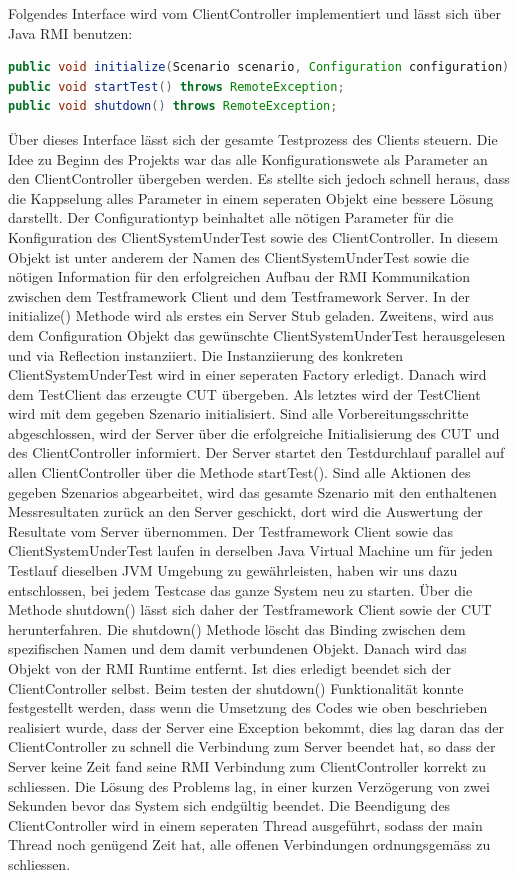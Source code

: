 Folgendes Interface wird vom ClientController implementiert und lässt sich über Java RMI benutzen:
\begin{lstlisting}[language=java, breaklines=true] 	
public void initialize(Scenario scenario, Configuration configuration) throws RemoteException;
public void startTest() throws RemoteException;
public void shutdown() throws RemoteException;
\end{lstlisting}
Über dieses Interface lässt sich der gesamte Testprozess des Clients steuern. Die Idee zu Beginn des Projekts war das alle Konfigurationswete als Parameter an den ClientController übergeben werden. Es stellte sich jedoch schnell heraus, dass die Kappselung alles Parameter in einem seperaten Objekt eine bessere Lösung darstellt. Der Configurationtyp beinhaltet alle nötigen Parameter für die Konfiguration des ClientSystemUnderTest sowie des ClientController. In diesem Objekt ist unter anderem der Namen des ClientSystemUnderTest sowie die nötigen Information für den erfolgreichen Aufbau der RMI Kommunikation zwischen dem Testframework Client und dem Testframework Server. In der initialize() Methode wird als erstes ein Server Stub geladen. Zweitens, wird aus dem Configuration Objekt das gewünschte ClientSystemUnderTest herausgelesen und via Reflection instanziiert. Die Instanziierung des konkreten ClientSystemUnderTest wird in einer seperaten Factory erledigt. Danach wird dem TestClient das erzeugte CUT übergeben. Als letztes wird der TestClient wird mit dem gegeben Szenario initialisiert. Sind alle Vorbereitungsschritte abgeschlossen, wird der Server über die erfolgreiche Initialisierung des CUT und des ClientController informiert. Der Server startet den Testdurchlauf parallel auf allen ClientController über die Methode startTest(). Sind alle Aktionen des gegeben Szenarios abgearbeitet, wird das gesamte Szenario mit den enthaltenen Messresultaten zurück an den Server geschickt, dort wird die Auswertung der Resultate vom Server übernommen. Der Testframework Client sowie das ClientSystemUnderTest laufen in derselben Java Virtual Machine um für jeden Testlauf dieselben JVM Umgebung zu gewährleisten, haben wir uns dazu entschlossen, bei jedem Testcase das ganze System neu zu starten. Über die Methode shutdown() lässt sich daher der Testframework Client sowie der CUT herunterfahren. Die shutdown() Methode löscht das Binding zwischen dem spezifischen Namen und dem damit verbundenen Objekt. Danach wird das Objekt von der RMI Runtime entfernt. Ist dies erledigt beendet sich der ClientController selbst. Beim testen der shutdown() Funktionalität konnte festgestellt werden, dass wenn die Umsetzung des Codes wie oben beschrieben realisiert wurde, dass der Server eine Exception bekommt, dies lag daran das der ClientController zu schnell die Verbindung zum Server beendet hat, so dass der Server keine Zeit fand seine RMI Verbindung zum ClientController korrekt zu schliessen. Die Lösung des Problems lag, in einer kurzen Verzögerung von zwei Sekunden bevor das System sich endgültig beendet. Die Beendigung des ClientController wird in einem seperaten Thread ausgeführt, sodass der main Thread noch genügend Zeit hat, alle offenen Verbindungen ordnungsgemäss zu schliessen.    

